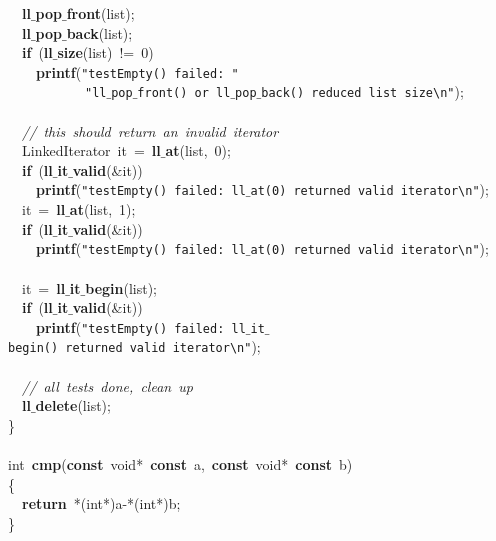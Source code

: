 \documentclass{article}
\begin{document}
\mbox{}\ \ \textbf{ll$\_$pop$\_$front}(list); \\
\mbox{}\ \ \textbf{ll$\_$pop$\_$back}(list); \\
\mbox{}\ \ \textbf{if}\ (\textbf{ll$\_$size}(list)\ !=\ 0) \\
\mbox{}\ \ \ \ \textbf{printf}(\texttt{"{}testEmpty()\ failed:\ "{}} \\
\mbox{}\ \ \ \ \ \ \ \ \ \ \ \texttt{"{}ll$\_$pop$\_$front()\ or\ ll$\_$pop$\_$back()\ reduced\ list\ size}\texttt{\textbackslash{}n}\texttt{"{}}); \\
\mbox{} \\
\mbox{}\ \ \textit{//\ this\ should\ return\ an\ invalid\ iterator} \\
\mbox{}\ \ LinkedIterator\ it\ =\ \textbf{ll$\_$at}(list,\ 0); \\
\mbox{}\ \ \textbf{if}\ (\textbf{ll$\_$it$\_$valid}(\&it)) \\
\mbox{}\ \ \ \ \textbf{printf}(\texttt{"{}testEmpty()\ failed:\ ll$\_$at(0)\ returned\ valid\ iterator}\texttt{\textbackslash{}n}\texttt{"{}}); \\
\mbox{}\ \ it\ =\ \textbf{ll$\_$at}(list,\ 1); \\
\mbox{}\ \ \textbf{if}\ (\textbf{ll$\_$it$\_$valid}(\&it)) \\
\mbox{}\ \ \ \ \textbf{printf}(\texttt{"{}testEmpty()\ failed:\ ll$\_$at(0)\ returned\ valid\ iterator}\texttt{\textbackslash{}n}\texttt{"{}}); \\
\mbox{} \\
\mbox{}\ \ it\ =\ \textbf{ll$\_$it$\_$begin}(list); \\
\mbox{}\ \ \textbf{if}\ (\textbf{ll$\_$it$\_$valid}(\&it)) \\
\mbox{}\ \ \ \ \textbf{printf}(\texttt{"{}testEmpty()\ failed:\ ll$\_$it$\_$begin()\ returned\ valid\ iterator}\texttt{\textbackslash{}n}\texttt{"{}}); \\
\mbox{} \\
\mbox{}\ \ \textit{//\ all\ tests\ done,\ clean\ up} \\
\mbox{}\ \ \textbf{ll$\_$delete}(list); \\
\mbox{}\} \\
\mbox{} \\
\mbox{}int\ \textbf{cmp}(\textbf{const}\ void*\ \textbf{const}\ a,\ \textbf{const}\ void*\ \textbf{const}\ b) \\
\mbox{}\{ \\
\mbox{}\ \ \textbf{return}\ *(int*)a-*(int*)b; \\
\mbox{}\} \\
\end{document}
